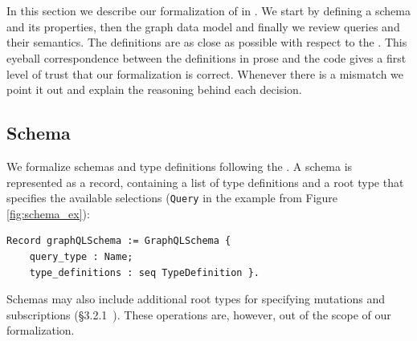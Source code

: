 \section{\gcoql}\label{sec:form}

In this section we describe our formalization of \gql in \coq. We start by defining a schema and its properties, then the graph data model and finally we review queries and their semantics. The definitions are as close as possible with respect to the \spec. This eyeball correspondence between the definitions in prose and the code gives a first level of trust that our formalization is correct.%
Whenever there is a mismatch we point it out and explain the reasoning behind each decision.


\subsection{Schema}\label{subsec:schema}
We formalize schemas and type definitions following the \spec. A schema is represented as a record, containing a list of type definitions and a root type that specifies the available selections (\eg \texttt{Query} in the example from Figure \ref{fig:schema_ex}):
%

\begin{verbatim}
Record graphQLSchema := GraphQLSchema {
    query_type : Name;
    type_definitions : seq TypeDefinition }.
\end{verbatim}
%
Schemas may also include additional root types for specifying mutations and subscriptions (\cf\S3.2.1~\cite{gqlspec}). These operations are, however, out of the scope of our formalization.

